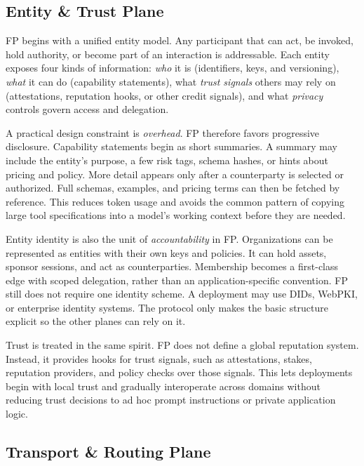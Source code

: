 \documentclass{llmxive}
\begin{document}
\subsection{Entity \& Trust Plane}
\label{subsec:entity}

FP begins with a unified entity model. Any participant that can act, be invoked, hold authority, or become part of an interaction is addressable. Each entity exposes four kinds of information: \emph{who} it is (identifiers, keys, and versioning), \emph{what} it can do (capability statements), what \emph{trust signals} others may rely on (attestations, reputation hooks, or other credit signals), and what \emph{privacy} controls govern access and delegation.

A practical design constraint is \emph{overhead}. FP therefore favors progressive disclosure. Capability statements begin as short summaries. A summary may include the entity's purpose, a few risk tags, schema hashes, or hints about pricing and policy. More detail appears only after a counterparty is selected or authorized. Full schemas, examples, and pricing terms can then be fetched by reference. This reduces token usage and avoids the common pattern of copying large tool specifications into a model's working context before they are needed.

Entity identity is also the unit of \emph{accountability} in FP. Organizations can be represented as entities with their own keys and policies. It can hold assets, sponsor sessions, and act as counterparties. Membership becomes a first-class edge with scoped delegation, rather than an application-specific convention. FP still does not require one identity scheme. A deployment may use DIDs, WebPKI, or enterprise identity systems. The protocol only makes the basic structure explicit so the other planes can rely on it.

Trust is treated in the same spirit. FP does not define a global reputation system. Instead, it provides hooks for trust signals, such as attestations, stakes, reputation providers, and policy checks over those signals. This lets deployments begin with local trust and gradually interoperate across domains without reducing trust decisions to ad hoc prompt instructions or private application logic.


\subsection{Transport \& Routing Plane}
\label{subsec:transport}
\end{document}
